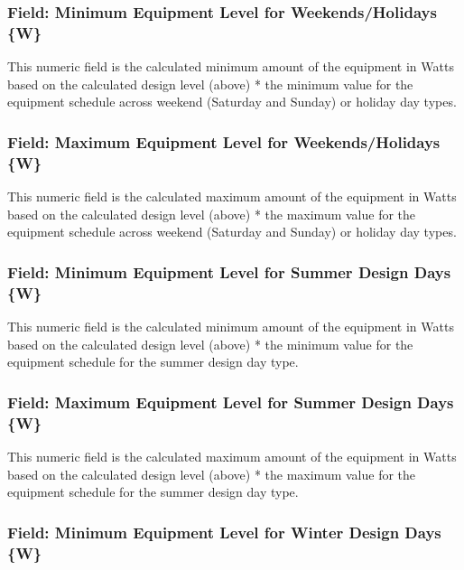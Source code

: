 \subsubsection{Field: Minimum Equipment Level for Weekends/Holidays \{W\}}\label{field-minimum-equipment-level-for-weekends-holidays-w-1}

This numeric field is the calculated minimum amount of the equipment in Watts based on the calculated design level (above) * the minimum value for the equipment schedule across weekend (Saturday and Sunday) or holiday day types.

\subsubsection{Field: Maximum Equipment Level for Weekends/Holidays \{W\}}\label{field-maximum-equipment-level-for-weekends-holidays-w-1}

This numeric field is the calculated maximum amount of the equipment in Watts based on the calculated design level (above) * the maximum value for the equipment schedule across weekend (Saturday and Sunday) or holiday day types.

\subsubsection{Field: Minimum Equipment Level for Summer Design Days \{W\}}\label{field-minimum-equipment-level-for-summer-designdays-w-1}

This numeric field is the calculated minimum amount of the equipment in Watts based on the calculated design level (above) * the minimum value for the equipment schedule for the summer design day type.

\subsubsection{Field: Maximum Equipment Level for Summer Design Days \{W\}}\label{field-maximum-equipment-level-for-summer-designdays-w-1}

This numeric field is the calculated maximum amount of the equipment in Watts based on the calculated design level (above) * the maximum value for the equipment schedule for the summer design day type.

\subsubsection{Field: Minimum Equipment Level for Winter Design Days \{W\}}\label{field-minimum-equipment-level-for-winter-designdays-w-1}

